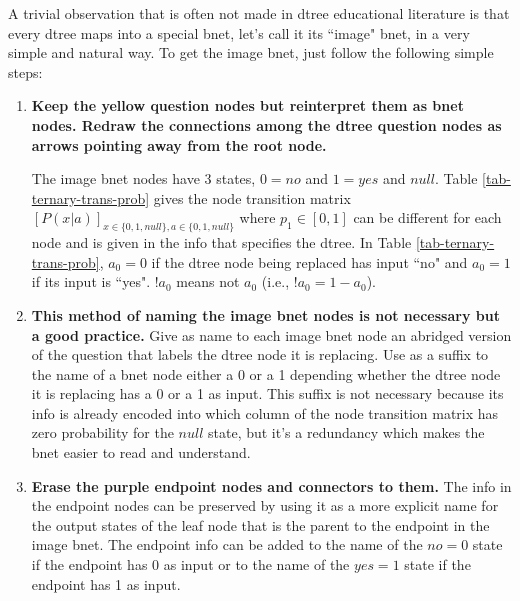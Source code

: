 A trivial 
observation
that is often not made
in dtree educational literature
is that every dtree 
maps into a special bnet, 
let's call it
its ``image" bnet,
in a very simple and natural way.
To get the
 image bnet, just follow the
following simple steps:
\begin{enumerate}
\item {\bf Keep
the yellow question nodes
but reinterpret them as bnet nodes.
Redraw the connections among
the dtree question nodes
 as arrows pointing
away from the root node.}

The image bnet nodes
have 3 states,  $0=no$ and
$1=yes$ and $null$.
Table \ref{tab-ternary-trans-prob}
gives the 
node transition matrix $[P(x|a)]_{
x\in \{0,1,null\}, 
a\in \{0,1,null\}}$
where $p_1\in[0,1]$ can be 
different for each node and is given
in the info that specifies    
the dtree. In Table 
\ref{tab-ternary-trans-prob},
$a_0= 0$ if the
dtree node being replaced has input
``no" and $a_0=1$ if its 
input is ``yes".
$!a_0$ means not $a_0$ (i.e., $!a_0=1-a_0$).
\item
{\bf This method of naming
the image bnet nodes
is not necessary but a good practice.}
Give as name to each image bnet
node 
an abridged 
version of
the question
that labels the dtree node it is replacing.
Use as a suffix
to the name of a 
bnet node either a 0 or a 1
depending whether
the dtree node it is replacing
has a 0 or a 1 as input.
This suffix is not
necessary because its
info is already encoded
into
which column
of the node transition matrix has 
zero probability for the
$null$ state, but
it's  a redundancy which makes
the bnet easier to read and understand.
\item {\bf Erase the purple endpoint
nodes and connectors to them.} The
info in the endpoint nodes
can be preserved
by using it
as a more
explicit name
for the output
states of the
leaf node that 
is the parent
to the endpoint 
in the image bnet.
The
endpoint info can
be added to the name of
the $no=0$ state if the
endpoint has 0 as input 
or to the name
of the $yes=1$ state if 
the endpoint has 1 as input.
\end{enumerate}

